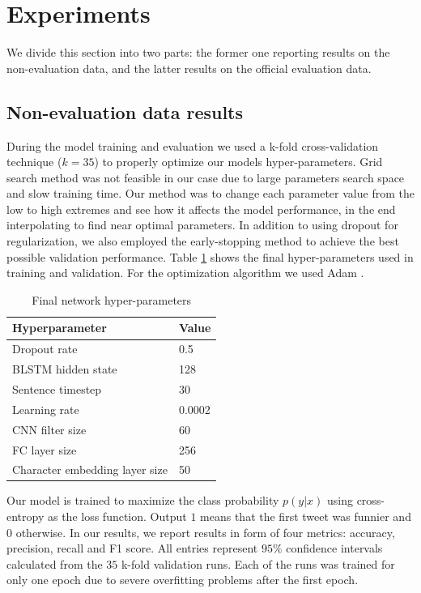 \documentclass[10pt, a4paper]{article}
\begin{document}
\section{Experiments}
We divide this section into two parts: the former one reporting results on the non-evaluation data, and the latter results on the official evaluation data.

\subsection{Non-evaluation data results}
During the model training and evaluation we used a k-fold cross-validation technique ($k=35$) to properly optimize our models hyper-parameters. Grid search method was not feasible in our case due to large parameters search space and slow training time. Our method was to change each parameter value from the low to high extremes and see how it affects the model performance, in the end interpolating to find near optimal parameters. In addition to using dropout for regularization, we also employed the early-stopping \citep{early_stopping} method to achieve the best possible validation performance. Table \ref{tab:hyperparams} shows the final hyper-parameters used in training and validation. For the optimization algorithm we used Adam \citep{adam2014}.

\begin{table}
\small
\caption{Final network hyper-parameters}
 \label{tab:hyperparams}
 \begin{center}
 \begin{tabular}{ll}
 \toprule
     Hyperparameter & Value\\
 \midrule
     Dropout rate & 0.5\\
     BLSTM hidden state & 128\\
     Sentence timestep & 30\\
     Learning rate & 0.0002\\
     CNN filter size & 60 \\
     FC layer size & 256\\
     Character embedding layer size & 50\\
 \bottomrule
 \end{tabular}
 \end{center}
\end{table}

Our model is trained to maximize the class probability $p(y \vert x)$ using
cross-entropy as the loss function. Output $1$ means that the first tweet was
funnier and $0$ otherwise. 
In our results, we report results in form of
four metrics: accuracy, precision, recall and F1 score. All entries represent
$95\%$ confidence intervals calculated from the $35$ k-fold validation runs.
Each of the runs was trained for only one epoch due to severe overfitting
problems after the first epoch.
\end{document}

